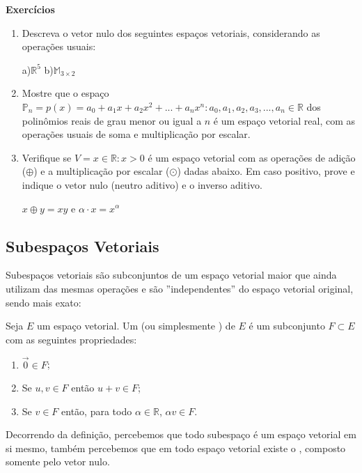 \documentclass[../main.tex]{subfiles}
\begin{document}
		{\Large\textbf{Exercícios}}
		\begin{enumerate}
			\item Descreva o vetor nulo dos seguintes espaços vetoriais, considerando as operações usuais: \hfill 
			\begin{center}
				a)$\mathbb{R}^5$ \hspace{4cm} b)$\mathbb{M}_{3\times 2}$ \hspace{4cm}
			\end{center}
			\item Mostre que o espaço $\mathbb{P}_n = p(x) = a_0 + a_1 x + a_2 x^2 + ... + a_n x^n : a_0, a_1, a_2, a_3, ..., a_n \in \mathbb{R}$ dos
			polinômios reais de grau menor ou igual a $n$ é um espaço vetorial real, com as operações usuais de soma e multiplicação por escalar.
			\item Verifique se $V = {x \in \mathbb{R}: x > 0}$ é um espaço vetorial com as operações de adição ($\oplus$) e a multiplicação por escalar ($\odot$) dadas abaixo. Em caso positivo, prove e indique o vetor nulo (neutro aditivo) e o inverso aditivo.
			\begin{center}
				$x \oplus y = xy$ \hspace{1cm} e \hspace{1cm} $\alpha \cdot x = x^\alpha$
			\end{center}
		\end{enumerate} 
		\newpage
	\subsection{Subespaços Vetoriais}
		Subespaços vetoriais são subconjuntos de um espaço vetorial maior que ainda utilizam das mesmas operações e são ''independentes'' do espaço vetorial original, sendo mais exato:
		\begin{definicao}
			Seja $E$ um espaço vetorial. Um  (ou simplesmente ) de $E$ é um subconjunto $F \subset E$ com as seguintes propriedades:
				\begin{enumerate}
				\item[(P1)] $\vec{0} \in F$;
				\item[(P2)] Se $u, v \in F$ então $u+v \in F$;
				\item[(P3)] Se $v \in F$ então, para todo $\alpha \in \mathbb{R}$, $\alpha v \in F$.
			\end{enumerate}
		\end{definicao}
		Decorrendo da definição, percebemos que todo subespaço é um espaço vetorial em si mesmo, também percebemos que em todo espaço vetorial existe o , composto somente pelo vetor nulo.\\ \bigskip
		
\end{document}
